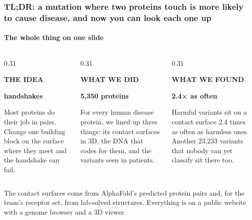 \documentclass[10pt,aspectratio=169]{beamer}
\newcommand{\headline}[1]{{\Large\bfseries\color{accent}#1}}
\begin{document}
\begin{frame}
  \frametitle{TL;DR: a mutation where two proteins touch is more likely to cause disease, and now you can look each one up}
  \framesubtitle{The whole thing on one slide}
  \vspace{1mm}
  \begin{columns}[T,onlytextwidth]
    \begin{column}{0.31\textwidth}
      {\footnotesize\bfseries\color{mute}THE IDEA\par}\vspace{1.5mm}
      \headline{handshakes}\par\vspace{1.5mm}
      {\small Most proteins do their job in pairs. Change one building block on
      the surface where they meet and the handshake can fail.\par}
    \end{column}
    \begin{column}{0.31\textwidth}
      {\footnotesize\bfseries\color{mute}WHAT WE DID\par}\vspace{1.5mm}
      \headline{5,350 proteins}\par\vspace{1.5mm}
      {\small For every human disease protein, we lined up three things: its
      contact surfaces in 3D, the DNA that codes for them, and the variants
      seen in patients.\par}
    \end{column}
    \begin{column}{0.31\textwidth}
      {\footnotesize\bfseries\color{mute}WHAT WE FOUND\par}\vspace{1.5mm}
      \headline{2.4× as often}\par\vspace{1.5mm}
      {\small Harmful variants sit on a contact surface 2.4 times as often as
      harmless ones. Another 23,233 variants that nobody can yet classify sit
      there too.\par}
    \end{column}
  \end{columns}
  \vspace{5mm}
  {\small\color{mute}The contact surfaces come from AlphaFold's predicted protein
  pairs and, for the team's receptor set, from lab-solved structures. Everything
  is on a public website with a genome browser and a 3D viewer.\par}
\end{frame}
\end{document}
